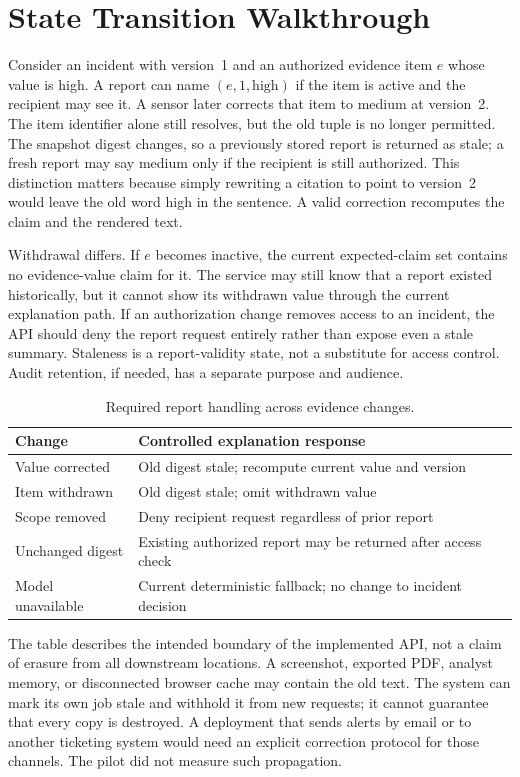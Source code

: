\section{State Transition Walkthrough}
Consider an incident with version~1 and an authorized evidence item $e$ whose value is high. A report can name $(e,1,\mathrm{high})$ if the item is active and the recipient may see it. A sensor later corrects that item to medium at version~2. The item identifier alone still resolves, but the old tuple is no longer permitted. The snapshot digest changes, so a previously stored report is returned as stale; a fresh report may say medium only if the recipient is still authorized. This distinction matters because simply rewriting a citation to point to version~2 would leave the old word high in the sentence. A valid correction recomputes the claim and the rendered text.

Withdrawal differs. If $e$ becomes inactive, the current expected-claim set contains no evidence-value claim for it. The service may still know that a report existed historically, but it cannot show its withdrawn value through the current explanation path. If an authorization change removes access to an incident, the API should deny the report request entirely rather than expose even a stale summary. Staleness is a report-validity state, not a substitute for access control. Audit retention, if needed, has a separate purpose and audience.

\begin{table}[t]
\centering\caption{Required report handling across evidence changes.}
\label{tab:transitions}
\begin{tabular}{p{}p{}}
\hline
Change & Controlled explanation response\\\hline
Value corrected & Old digest stale; recompute current value and version\\
Item withdrawn & Old digest stale; omit withdrawn value\\
Scope removed & Deny recipient request regardless of prior report\\
Unchanged digest & Existing authorized report may be returned after access check\\
Model unavailable & Current deterministic fallback; no change to incident decision\\\hline
\end{tabular}
\end{table}

The table describes the intended boundary of the implemented API, not a claim of erasure from all downstream locations. A screenshot, exported PDF, analyst memory, or disconnected browser cache may contain the old text. The system can mark its own job stale and withhold it from new requests; it cannot guarantee that every copy is destroyed. A deployment that sends alerts by email or to another ticketing system would need an explicit correction protocol for those channels. The pilot did not measure such propagation.

